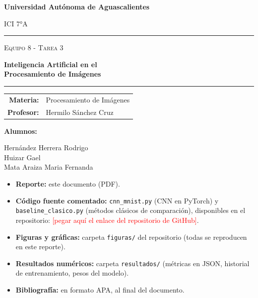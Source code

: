 \documentclass[11pt,letterpaper]{article}
\newcommand{\Repositorio}{\textcolor{red}{[pegar aquí el enlace del repositorio de GitHub]}}
\begin{document}
\begin{titlepage}
  \thispagestyle{empty}
  \centering
  \vspace*{0.5cm}
  {\LARGE\bfseries Universidad Autónoma de Aguascalientes\par}
  \vspace{0.6cm}
  {\Large ICI 7°A\par}
  \vspace{3.2cm}
  {\color{azul}\rule{\linewidth}{1.2pt}}\par\vspace{0.5cm}
  {\large\scshape Equipo 8 - Tarea 3\par}\vspace{0.3cm}
  {\huge\bfseries Inteligencia Artificial en el\\[0.15cm] Procesamiento de Imágenes\par}
  \vspace{0.4cm}
  {\color{azul}\rule{\linewidth}{1.2pt}}\par
  \vspace{2.2cm}
  {\large
  \begin{tabular}{rl}
    \textbf{Materia:}  & Procesamiento de Imágenes \\[0.25cm]
    \textbf{Profesor:} & Hermilo Sánchez Cruz \\
  \end{tabular}\par}
  \vfill
  {\large\textbf{Alumnos:}\par}
  \vspace{0.3cm}
  {\large
  Hernández Herrera Rodrigo\\[0.15cm]
  Huizar Gael\\[0.15cm]
  Mata Araiza Maria Fernanda\par}
  \vspace*{1.5cm}
\end{titlepage}

\setcounter{page}{2}
\tableofcontents
\vspace{0.6cm}
\begin{tcolorbox}[colback=grisclaro,colframe=black!15,boxrule=0.4pt,arc=1pt,title={\bfseries Entregables},coltitle=black,colbacktitle=black!8]
\begin{itemize}[leftmargin=1.2em]
  \item \textbf{Reporte:} este documento (PDF).
  \item \textbf{Código fuente comentado:} \texttt{cnn\_mnist.py} (CNN en PyTorch) y \texttt{baseline\_clasico.py} (métodos clásicos de comparación), disponibles en el repositorio: \Repositorio.
  \item \textbf{Figuras y gráficas:} carpeta \texttt{figuras/} del repositorio (todas se reproducen en este reporte).
  \item \textbf{Resultados numéricos:} carpeta \texttt{resultados/} (métricas en JSON, historial de entrenamiento, pesos del modelo).
  \item \textbf{Bibliografía:} en formato APA, al final del documento.
\end{itemize}
\end{tcolorbox}
\end{document}

